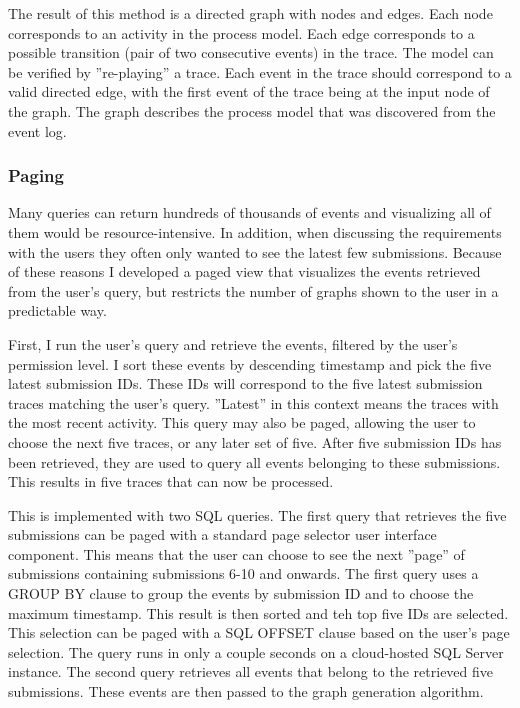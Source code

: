 The result of this method is a directed graph with nodes and edges.
Each node corresponds to an activity in the process model.
Each edge corresponds to a possible transition (pair of two consecutive events) in the trace.
The model can be verified by ''re-playing'' a trace. 
Each event in the trace should correspond to a valid directed edge, with the first event of the trace being at the input node of the graph.
The graph describes the process model that was discovered from the event log.


\subsubsection{Paging}
\label{sec:paging}

Many queries can return hundreds of thousands of events and visualizing all of them would be resource-intensive.
In addition, when discussing the requirements with the users they often only wanted to see the latest few submissions.
Because of these reasons I developed a paged view that visualizes the events retrieved from the user's query, but restricts the number of graphs shown to the user in a predictable way.

First, I run the user's query and retrieve the events, filtered by the user's permission level.
I sort these events by descending timestamp and pick the five latest submission IDs.
These IDs will correspond to the five latest submission traces matching the user's query.
''Latest'' in this context means the traces with the most recent activity.
This query may also be paged, allowing the user to choose the next five traces, or any later set of five.
After five submission IDs has been retrieved, they are used to query all events belonging to these submissions. This results in five traces that can now be processed.

This is implemented with two SQL queries.
The first query that retrieves the five submissions can be paged with a standard page selector user interface component.
This means that the user can choose to see the next ''page'' of submissions containing submissions 6-10 and onwards. 
The first query uses a GROUP BY clause to group the events by submission ID and to choose the maximum timestamp.
This result is then sorted and teh top five IDs are selected.
This selection can be paged with a SQL OFFSET clause based on the user's page selection.
The query runs in only a couple seconds on a cloud-hosted SQL Server instance.
The second query retrieves all events that belong to the retrieved five submissions.
These events are then passed to the graph generation algorithm.

